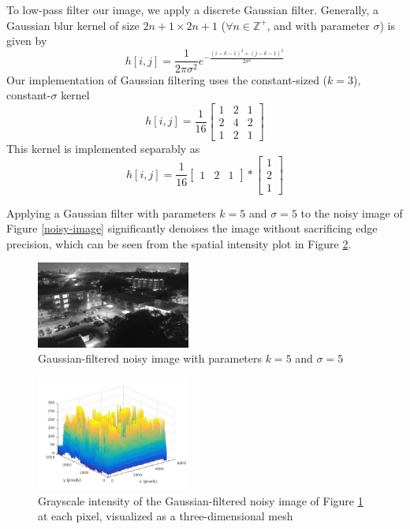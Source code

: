 \documentclass[journal]{IEEEtran}
\begin{document}
To low-pass filter our image, we apply a discrete Gaussian filter. Generally, a Gaussian blur kernel of size $2n + 1 \times 2n + 1$ ($\forall n \in \mathbb{Z}^+$, and with parameter $\sigma$) is given by
$$h[i, j] = \frac{1}{2\pi \sigma^2}e^{-\frac{(i - k - 1)^2 + (j - k - 1)^2}{2\sigma^2}}$$
Our implementation of Gaussian filtering uses the constant-sized ($k = 3$), constant-$\sigma$ kernel
\[
h[i, j] = \frac{1}{16}
\begin{bmatrix}
	1 & 2 & 1 \\
	2 & 4 & 2 \\
	1 & 2 & 1
\end{bmatrix}
\]
This kernel is implemented separably as
\begin{equation}
	\label{gaussian-filter}
	h[i, j] = \frac{1}{16}
	\begin{bmatrix}
		1 & 2 & 1
	\end{bmatrix}
	*
	\begin{bmatrix}
		1 \\ 2 \\ 1
	\end{bmatrix}
\end{equation}
\par Applying a Gaussian filter with parameters $k = 5$ and $\sigma = 5$ to the noisy image of Figure \ref{noisy-image} significantly denoises the image without sacrificing edge precision, which can be seen from the spatial intensity plot in Figure \ref{filtered-noisy-image-mesh}.
\begin{figure}[H]
	\centering
	\includegraphics[width=0.45\textwidth]{filtered_noisy_image.jpg}
	\caption{Gaussian-filtered noisy image with parameters $k = 5$ and $\sigma = 5$}
    \label{filtered-noisy-image}
\end{figure}
\begin{figure}[h]
	\centering
	\includegraphics[width=0.45\textwidth]{filtered_noisy_image_mesh.jpg}
	\caption{Grayscale intensity of the Gaussian-filtered noisy image of Figure \ref{filtered-noisy-image} at each pixel, visualized as a three-dimensional mesh}
    \label{filtered-noisy-image-mesh}
\end{figure}
\end{document}

